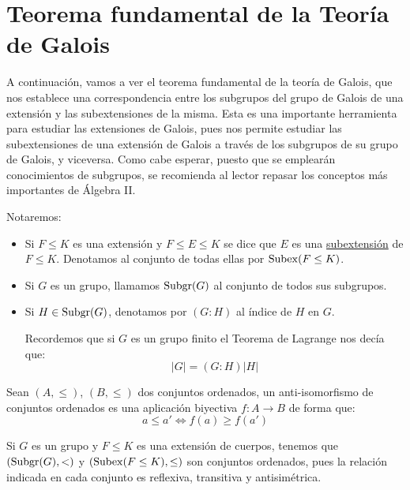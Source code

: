 \section{Teorema fundamental de la Teoría de Galois}

A continuación, vamos a ver el teorema fundamental de la teoría de Galois, que nos establece una correspondencia entre los subgrupos del grupo de Galois de una extensión y las subextensiones de la misma. Esta es una importante herramienta para estudiar las extensiones de Galois, pues nos permite estudiar las subextensiones de una extensión de Galois a través de los subgrupos de su grupo de Galois, y viceversa. Como cabe esperar, puesto que se emplearán conocimientos de subgrupos, se recomienda al lector repasar los conceptos más importantes de Álgebra II.

\begin{notacion}
    Notaremos:
    \begin{itemize}
        \item Si $F\leq K$ es una extensión y $F\leq E \leq K$ se dice que $E$ es una \underline{subextensión} de $F\leq K$. Denotamos al conjunto de todas ellas por $\operatorname{Subex}(F\leq K)$.
        \item Si $G$ es un grupo, llamamos $\operatorname{Subgr}(G)$ al conjunto de todos sus subgrupos.
        \item Si $H\in \operatorname{Subgr}(G)$, denotamos por $(G:H)$ al índice de $H$ en $G$.

            Recordemos que si $G$ es un grupo finito el Teorema de Lagrange nos decía que:
            \begin{equation*}
                |G| = (G:H)|H|
            \end{equation*}
    \end{itemize}
\end{notacion}

\begin{definicion}
    Sean $(A,\leq)$, $(B,\leq)$ dos conjuntos ordenados, un anti-isomorfismo de conjuntos ordenados es una aplicación biyectiva $f:A\to B$ de forma que:
    \begin{equation*}
        a\leq a' \Longleftrightarrow  f(a)\geq f(a')
    \end{equation*}
\end{definicion}

\begin{observacion}
    Si $G$ es un grupo y $F\leq K$ es una extensión de cuerpos, tenemos que $(\operatorname{Subgr}(G),<)$ y $(\operatorname{Subex}(F\leq K),\leq)$ son conjuntos ordenados, pues la relación indicada en cada conjunto es reflexiva, transitiva y antisimétrica.
\end{observacion}

